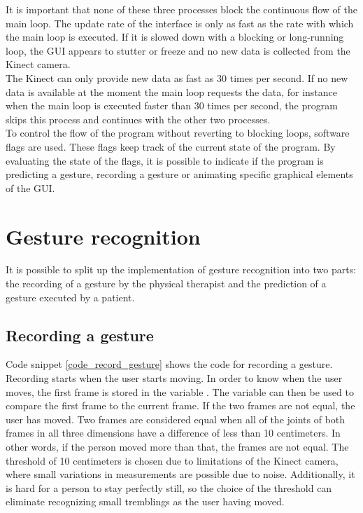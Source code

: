 It is important that none of these three processes block the continuous flow of the main loop. The update rate of the interface is only as fast as the rate with which the main loop is executed. If it is slowed down with a blocking or long-running loop, the GUI appears to stutter or freeze and no new data is collected from the Kinect camera.\\

The Kinect can only provide new data as fast as 30 times per second. If no new data is available at the moment the main loop requests the data, for instance when the main loop is executed faster than 30 times per second, the program skips this process and continues with the other two processes.\\

To control the flow of the program without reverting to blocking loops, software flags are used. These flags keep track of the current state of the program. By evaluating the state of the flags, it is possible to indicate if the program is predicting a gesture, recording a gesture or animating specific graphical elements of the GUI.


\section{Gesture recognition}

It is possible to split up the implementation of gesture recognition into two parts: the recording of a gesture by the physical therapist and the prediction of a gesture executed by a patient.


\subsection{Recording a gesture}

Code snippet \ref{code_record_gesture} shows the code for recording a gesture. Recording starts when the user starts moving. In order to know when the user moves, the first frame is stored in the variable . The variable can then be used to compare the first frame to the current frame. If the two frames are not equal, the user has moved. Two frames are considered equal when all of the joints of both frames in all three dimensions have a difference of less than 10 centimeters. In other words, if the person moved more than that, the frames are not equal. The threshold of 10 centimeters is chosen due to limitations of the Kinect camera, where small variations in measurements are possible due to noise. Additionally, it is hard for a person to stay perfectly still, so the choice of the threshold can eliminate recognizing small tremblings as the user having moved.\\

